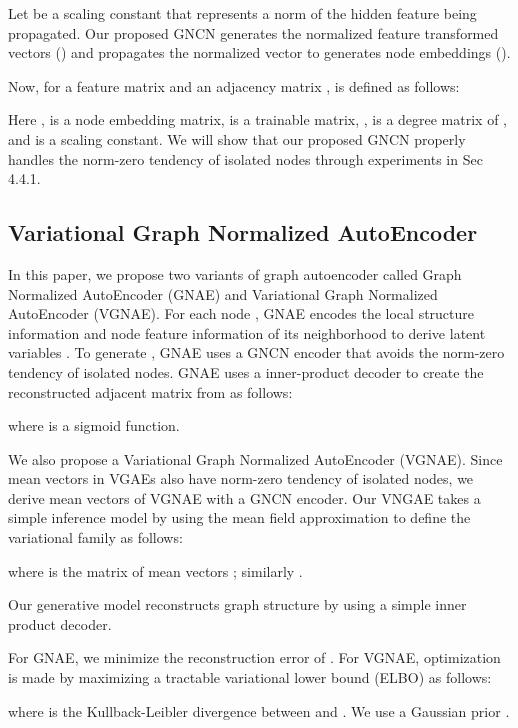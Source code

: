 \documentclass[sigconf]{acmart}
\begin{document}
Let  be a scaling constant that represents a norm of the hidden feature being propagated.
Our proposed GNCN generates the normalized feature transformed vectors () and propagates the normalized
vector to generates node embeddings ().



Now, for a feature matrix  and an adjacency matrix ,  is defined as follows:


Here  ,   is a node embedding matrix,  is a trainable matrix, ,  is a degree matrix of , and  is a scaling constant. 
We will show that our proposed GNCN properly handles the norm-zero tendency of isolated nodes through experiments in Sec 4.4.1.


\subsection{Variational Graph Normalized AutoEncoder}

In this paper, we propose two variants of graph autoencoder called Graph Normalized AutoEncoder (GNAE) and Variational Graph Normalized AutoEncoder (VGNAE).
For each node , GNAE encodes the local structure information and node feature information of its neighborhood to derive latent variables .
To generate , GNAE uses a GNCN encoder that avoids the norm-zero tendency of isolated nodes.
GNAE uses a inner-product decoder to create the reconstructed adjacent matrix  from  as follows:

where  is a sigmoid function.

We also propose a Variational Graph Normalized AutoEncoder (VGNAE).
Since mean vectors in VGAEs also have norm-zero tendency of isolated nodes, we derive mean vectors of VGNAE with a GNCN encoder.
Our VNGAE takes a simple inference model by using the mean field approximation to define the variational family as follows:

where  is the matrix of mean vectors  ; similarly .

Our generative model reconstructs graph structure  by using a simple inner product decoder.



For GNAE, we minimize the reconstruction error of .
For VGNAE, optimization is made by maximizing a tractable variational lower bound (ELBO) as follows:

where  is the Kullback-Leibler divergence between  and .
We use a Gaussian prior    .
\end{document}
